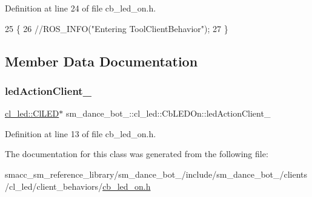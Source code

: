 Definition at line 24 of file cb\+\_\+led\+\_\+on.\+h.


\begin{DoxyCode}
25   \{
26     \textcolor{comment}{//ROS\_INFO("Entering ToolClientBehavior");}
27   \}
\end{DoxyCode}


\subsection{Member Data Documentation}
\mbox{\label{classsm__dance__bot__2_1_1cl__led_1_1CbLEDOn_aceeb4355c0578e62047388ad21c9df8b}} 
\subsubsection{\texorpdfstring{led\+Action\+Client\+\_\+}{ledActionClient\_}}
{\footnotesize\ttfamily \hyperlink{classsm__dance__bot__2_1_1cl__led_1_1ClLED}{cl\+\_\+led\+::\+Cl\+L\+ED}$\ast$ sm\+\_\+dance\+\_\+bot\+\_\+::cl\+\_\+led\+::\+Cb\+L\+E\+D\+On\+::led\+Action\+Client\+\_\+}



Definition at line 13 of file cb\+\_\+led\+\_\+on.\+h.



The documentation for this class was generated from the following file\+:\begin{DoxyCompactItemize}
\item 
smacc\+\_\+sm\+\_\+reference\+\_\+library/sm\+\_\+dance\+\_\+bot\+\_/include/sm\+\_\+dance\+\_\+bot\+\_/clients/cl\+\_\+led/client\+\_\+behaviors/\hyperlink{sm__dance__bot__2_2include_2sm__dance__bot__2_2clients_2cl__led_2client__behaviors_2cb__led__on_8h}{cb\+\_\+led\+\_\+on.\+h}\end{DoxyCompactItemize}
